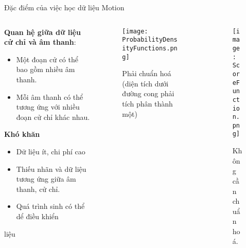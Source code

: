 \begin{frame}{Đặc điểm của việc học dữ liệu Motion}
	
\begin{columns}
	\begin{column}{0.55\textwidth}
		\textbf{Quan hệ giữa dữ liệu cử chỉ và âm thanh}:
		\begin{itemize}
			\item Một đoạn cử có thể bao gồm nhiều âm thanh.
			\item Mỗi âm thanh có thể tương ứng với nhiều đoạn cử chỉ khác nhau.
		\end{itemize}
		\textbf{Khó khăn}
		\begin{itemize}
			\item Dữ liệu ít, chi phí cao
			\item Thiếu nhãn và dữ liệu tương ứng giữa âm thanh, cử chỉ.
			\item Quá trình sinh có thể dể điều khiển 
		\end{itemize}
		liệu
	\end{column}
	\begin{column}{0.45\textwidth}
		
		\begin{columns}
			\begin{column}{0.5\textwidth}
				\begin{figure}
					\texttt{[image: ProbabilityDensityFunctions.png]}
					\caption{\scriptsize Phải chuẩn hoá (diện tích dưới đường cong phải tích phân thành một)}
				\end{figure}
			\end{column}
			\begin{column}{0.5\textwidth}
				\begin{figure}
					\texttt{[image: ScoreFunction.png]}
					\caption{\scriptsize Không cần chuẩn hoá.}
				\end{figure}
			\end{column}
		\end{columns}
		
		
		

\end{column}
\end{columns}
\end{frame}
